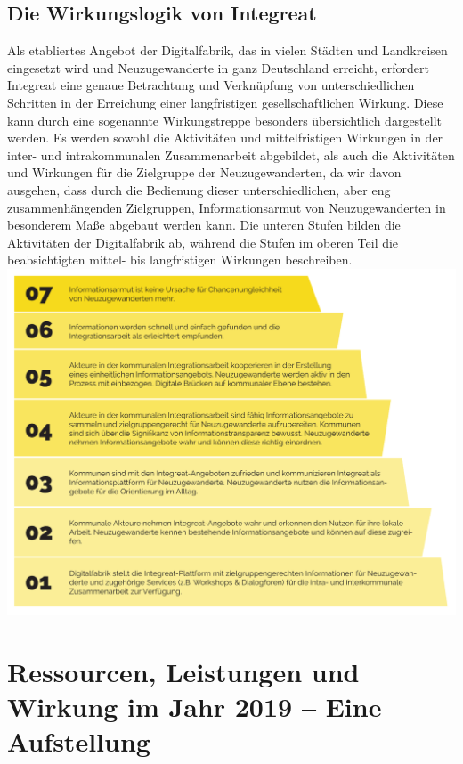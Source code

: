 \documentclass[12pt, a4paper]{article} %
\begin{document}
\hypertarget{die-wirkungslogik-von-integreat}{%
\subsection{Die Wirkungslogik von
Integreat}\label{die-wirkungslogik-von-integreat}}

Als etabliertes Angebot der Digitalfabrik, das in vielen Städten und
Landkreisen eingesetzt wird und Neuzugewanderte in ganz Deutschland
erreicht, erfordert Integreat eine genaue Betrachtung und Verknüpfung
von unterschiedlichen Schritten in der Erreichung einer langfristigen
gesellschaftlichen Wirkung. Diese kann durch eine sogenannte
Wirkungstreppe besonders übersichtlich dargestellt werden. Es werden
sowohl die Aktivitäten und mittelfristigen Wirkungen in der inter- und
intrakommunalen Zusammenarbeit abgebildet, als auch die Aktivitäten und
Wirkungen für die Zielgruppe der Neuzugewanderten, da wir davon
ausgehen, dass durch die Bedienung dieser unterschiedlichen, aber eng
zusammenhängenden Zielgruppen, Informationsarmut von Neuzugewanderten in
besonderem Maße abgebaut werden kann. Die unteren Stufen bilden die
Aktivitäten der Digitalfabrik ab, während die Stufen im oberen Teil die
beabsichtigten mittel- bis langfristigen Wirkungen beschreiben.
\includegraphics[width=\textwidth]{figure/Treppengrafik.pdf}

\hypertarget{ressourcen-leistungen-und-wirkung-im-jahr-2019-eine-aufstellung}{%
\section{Ressourcen, Leistungen und Wirkung im Jahr 2019 – Eine
Aufstellung}\label{ressourcen-leistungen-und-wirkung-im-jahr-2019-eine-aufstellung}}
\end{document}
